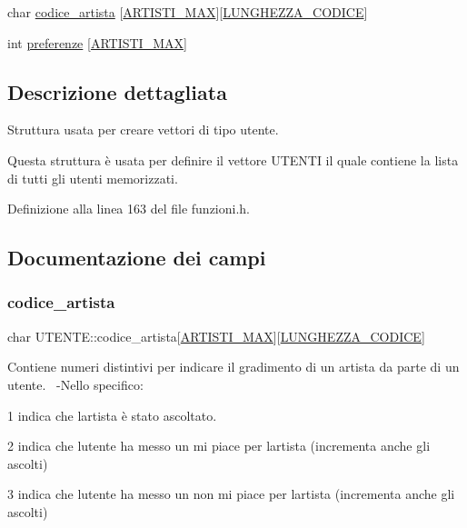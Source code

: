 \begin{DoxyCompactItemize}
char \mbox{\hyperlink{struct_u_t_e_n_t_e_a0c2bc40343dd678b5033f5c7084dfb43}{codice\+\_\+artista}} \mbox{[}\mbox{\hyperlink{funzioni_8h_af17e5297d3cc4c2db33d467698a1b9c2}{A\+R\+T\+I\+S\+T\+I\+\_\+\+M\+AX}}\mbox{]}\mbox{[}\mbox{\hyperlink{funzioni_8h_a15beac41f998f4495a79396160235665}{L\+U\+N\+G\+H\+E\+Z\+Z\+A\+\_\+\+C\+O\+D\+I\+CE}}\mbox{]}
\item 
int \mbox{\hyperlink{struct_u_t_e_n_t_e_a1b4dec4c7ed79c12a76501b634b71176}{preferenze}} \mbox{[}\mbox{\hyperlink{funzioni_8h_af17e5297d3cc4c2db33d467698a1b9c2}{A\+R\+T\+I\+S\+T\+I\+\_\+\+M\+AX}}\mbox{]}
\end{DoxyCompactItemize}


\subsection{Descrizione dettagliata}
Struttura usata per creare vettori di tipo utente. 

Questa struttura è usata per definire il vettore U\+T\+E\+N\+TI il quale contiene la lista di tutti gli utenti memorizzati. 

Definizione alla linea 163 del file funzioni.\+h.



\subsection{Documentazione dei campi}
\mbox{\label{struct_u_t_e_n_t_e_a0c2bc40343dd678b5033f5c7084dfb43}} 
\subsubsection{\texorpdfstring{codice\+\_\+artista}{codice\_artista}}
{\footnotesize\ttfamily char U\+T\+E\+N\+T\+E\+::codice\+\_\+artista\mbox{[}\mbox{\hyperlink{funzioni_8h_af17e5297d3cc4c2db33d467698a1b9c2}{A\+R\+T\+I\+S\+T\+I\+\_\+\+M\+AX}}\mbox{]}\mbox{[}\mbox{\hyperlink{funzioni_8h_a15beac41f998f4495a79396160235665}{L\+U\+N\+G\+H\+E\+Z\+Z\+A\+\_\+\+C\+O\+D\+I\+CE}}\mbox{]}}

Contiene numeri distintivi per indicare il gradimento di un artista da parte di un utente.~\newline
-\/\+Nello specifico\+:
\begin{DoxyEnumerate}
\item 1 indica che l\textquotesingle{}artista è stato ascoltato.
\item 2 indica che l\textquotesingle{}utente ha messo un mi piace per l\textquotesingle{}artista (incrementa anche gli ascolti)
\item 3 indica che l\textquotesingle{}utente ha messo un non mi piace per l\textquotesingle{}artista (incrementa anche gli ascolti) 
\end{DoxyEnumerate}

